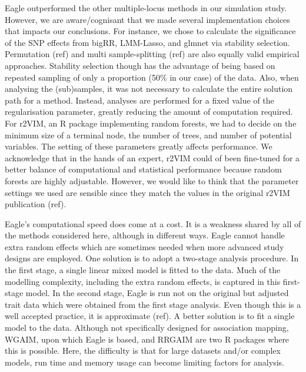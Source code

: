 \documentclass{article}
\begin{document}
Eagle outperformed the other multiple-locus methods in our simulation study. However, we are aware/cognisant that we made several implementation 
choices that impacts our conclusions.  For instance, we chose to calculate the significance of the 
SNP effects from bigRR, LMM-Lasso, and glmnet via stability selection.  Permutation (ref) and multi sample-splitting (ref) are also equally valid empirical approaches. Stability selection though has the advantage of being based on repeated sampling of only a proportion (50\% in our case) of the 
data. Also, when analysing the (sub)samples, it was not necessary to calculate the entire solution path for a method. 
 Instead,  analyses are 
performed for a fixed value of the regularisation parameter, greatly reducing the amount of computation required. For r2VIM, an R package 
implementing random forests, we had to decide on the  minimum size of a terminal node, the number of trees, and number of potential variables. 
The setting of these parameters greatly affects performance.  We  acknowledge that in the hands of an expert, 
r2VIM could of been fine-tuned for a better balance of computational and statistical performance because random forests are highly adjustable. 
However, we would like to think that the parameter settings we used are sensible since they match the values in the original r2VIM publication (ref). 

Eagle's computational speed does come at a cost. It is a weakness shared by all of the methods considered here, although in different ways. 
Eagle cannot handle extra random effects which are sometimes needed when more advanced study designs are employed. One solution 
is to adopt a two-stage analysis procedure. In the first stage, a single linear mixed model is fitted to the data. Much of the modelling complexity, 
including the extra random effects, is 
captured in this first-stage model. In the second stage, Eagle is run not on the original but adjusted trait data which were obtained from the first stage analysis. Even though this is a well accepted practice, it is approximate (ref).  A better solution is to fit a single model to the data. 
Although not specifically designed for association mapping,
WGAIM, upon which Eagle is based, and RRGAIM are two R packages where this is possible. Here, the difficulty is that for large datasets and/or complex 
models,  run time and memory usage can become limiting factors for analysis. 
\end{document}
